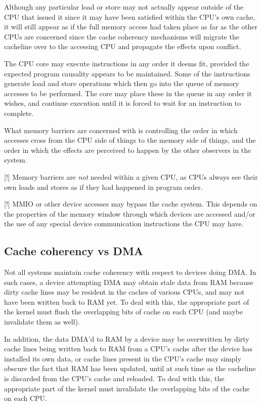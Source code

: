 Although any particular load or store may not actually appear outside of the
CPU that issued it since it may have been satisfied within the CPU's own cache,
it will still appear as if the full memory access had taken place as far as the
other CPUs are concerned since the cache coherency mechanisms will migrate the
cacheline over to the accessing CPU and propagate the effects upon conflict.

The CPU core may execute instructions in any order it deems fit, provided the
expected program causality appears to be maintained.  Some of the instructions
generate load and store operations which then go into the queue of memory
accesses to be performed.  The core may place these in the queue in any order
it wishes, and continue execution until it is forced to wait for an instruction
to complete.

What memory barriers are concerned with is controlling the order in which
accesses cross from the CPU side of things to the memory side of things, and
the order in which the effects are perceived to happen by the other observers
in the system.

[!] Memory barriers are \emph{not} needed within a given CPU, as CPUs always see
their own loads and stores as if they had happened in program order.

[!] MMIO or other device accesses may bypass the cache system.
This depends on the properties of the memory window through which devices
are accessed and/or the use of any special device communication instructions
the CPU may have.


\subsection{Cache coherency vs DMA}

Not all systems maintain cache coherency with respect to devices doing DMA\@.
In such cases, a device attempting DMA may obtain stale data from RAM because
dirty cache lines may be resident in the caches of various CPUs, and may not
have been written back to RAM yet.
To deal with this, the appropriate part of the kernel must flush the
overlapping bits of cache on each CPU (and maybe invalidate them as well).

In addition, the data DMA'd to RAM by a device may be overwritten by dirty
cache lines being written back to RAM from a CPU's cache after the device has
installed its own data, or cache lines present in the CPU's cache may simply
obscure the fact that RAM has been updated, until at such time as the cacheline
is discarded from the CPU's cache and reloaded.
To deal with this, the appropriate part of the kernel must invalidate the
overlapping bits of the cache on each CPU.


